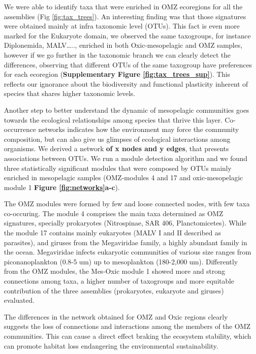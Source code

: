 \documentclass[fleqn,10pt]{wlscirep}
\begin{document}
We were able to identify taxa that were enriched in OMZ ecoregions for all the assemblies (Fig \ref{fig:tax_trees}). An interesting finding was that those signatures were obtained mainly at infra taxonomic level (OTUs). This fact is even more marked for the Eukaryote domain, we observed the same taxogroups, for instance Diplonemida, MALV….., enriched in both Oxic-mesopelagic and OMZ samples, however if we go further in the taxonomic branch we can clearly detect the differences, observing that different OTUs of the same taxogroup have preferences for each ecoregion (\textbf{Supplementary Figure \ref{fig:tax_trees_sup}}). This reflects our ignorance about the biodiversity and functional plasticity inherent of species that shares higher taxonomic levels.

Another step to better understand the dynamic of mesopelagic communities goes towards the ecological relationships among species that thrive this layer. Co-occurrence networks indicates how the environment may force the community composition, but can also give us glimpses of ecological interactions among organisms. We derived a network \textbf{of x nodes and y edges}, that presents associations between OTUs. We run a module detection algorithm and we found three statistically significant modules that were composed by OTUs mainly enriched in mesopelagic samples (OMZ-modules 4 and 17 and oxic-mesopelagic module 1 \textbf{Figure \ref{fig:networks}a-c}).

The OMZ modules were formed by few and loose connected nodes, with few taxa co-occuring. The module 4 comprises the main taxa determined as OMZ signatures, specially prokaryotes (Nitrospinae, SAR 406, Planctomicetes). While the module 17 contains mainly eukaryotes (MALV I and II described as parasites), and giruses from the Megaviridae family, a highly abundant family in the ocean. Megaviridae infects eukaryotic communities of various size ranges from piconanoplankton (0.8-5 um) up to mesoplankton (180-2,000 um). Differently from the OMZ modules, the Mes-Oxic module 1 showed more and strong connections among taxa, a higher number of taxogroups and more equitable contribution of the three assemblies (prokaryotes, eukaryote and giruses) evaluated.

The differences in the network obtained for OMZ and Oxic regions clearly suggests the loss of connections and interactions among the members of the OMZ communities. This can cause a direct effect braking the ecosystem stability, which can promote habitat loss endangering the environmental sustainability.
\end{document}
